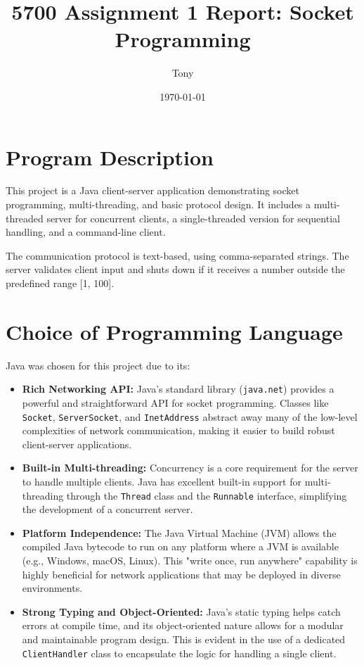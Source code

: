 \documentclass{article}
\title{5700 Assignment 1 Report: Socket Programming}
\author{Tony}
\date{\today}
\begin{document}
\maketitle

\section{Program Description}

This project is a Java client-server application demonstrating socket programming, multi-threading, and basic protocol design. It includes a multi-threaded server for concurrent clients, a single-threaded version for sequential handling, and a command-line client.

The communication protocol is text-based, using comma-separated strings. The server validates client input and shuts down if it receives a number outside the predefined range [1, 100].

\section{Choice of Programming Language}

Java was chosen for this project due to its:

\begin{itemize}
    \item \textbf{Rich Networking API:} Java's standard library (\texttt{java.net}) provides a powerful and straightforward API for socket programming. Classes like \texttt{Socket}, \texttt{ServerSocket}, and \texttt{InetAddress} abstract away many of the low-level complexities of network communication, making it easier to build robust client-server applications.
    \item \textbf{Built-in Multi-threading:} Concurrency is a core requirement for the server to handle multiple clients. Java has excellent built-in support for multi-threading through the \texttt{Thread} class and the \texttt{Runnable} interface, simplifying the development of a concurrent server.
    \item \textbf{Platform Independence:} The Java Virtual Machine (JVM) allows the compiled Java bytecode to run on any platform where a JVM is available (e.g., Windows, macOS, Linux). This "write once, run anywhere" capability is highly beneficial for network applications that may be deployed in diverse environments.
    \item \textbf{Strong Typing and Object-Oriented:} Java's static typing helps catch errors at compile time, and its object-oriented nature allows for a modular and maintainable program design. This is evident in the use of a dedicated \texttt{ClientHandler} class to encapsulate the logic for handling a single client.
\end{itemize}
\end{document}
